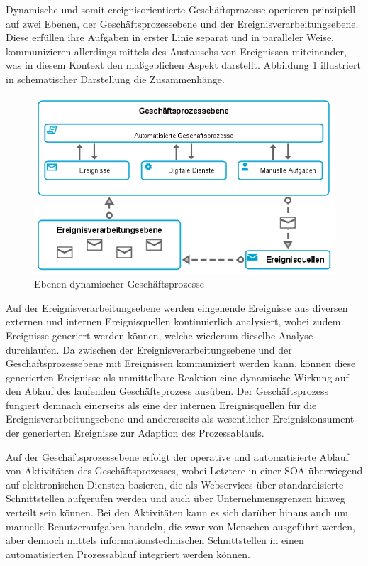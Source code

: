 Dynamische und somit ereignisorientierte Geschäftsprozesse operieren prinzipiell auf zwei Ebenen, der Geschäftsprozessebene und der Ereignisverarbeitungsebene. 
Diese erfüllen ihre Aufgaben in erster Linie separat und in paralleler Weise, kommunizieren allerdings mittels des Austauschs von Ereignissen miteinander, was in diesem Kontext den maßgeblichen Aspekt darstellt. 
Abbildung \ref{fig:Ebenen dynamischer Geschäftsprozesse} illustriert in schematischer Darstellung die Zusammenhänge.

\begin{figure}[H]
	\centering 
    \includegraphics[width=\textwidth]{img/dynamicbp.png}	
    \caption[Ebenen dynamischer Geschäftsprozesse]
    {Ebenen dynamischer Geschäftsprozesse \protect\footnotemark}
    \label{fig:Ebenen dynamischer Geschäftsprozesse}
\end{figure}


Auf der Ereignisverarbeitungsebene werden eingehende Ereignisse aus diversen externen und internen Ereignisquellen kontinuierlich analysiert, wobei zudem Ereignisse generiert werden können, welche wiederum dieselbe Analyse durchlaufen. 
Da zwischen der Ereignisverarbeitungsebene und der Geschäftsprozessebene mit Ereignissen kommuniziert werden kann, können diese generierten Ereignisse als unmittelbare Reaktion eine dynamische Wirkung auf den Ablauf des laufenden Geschäftsprozess ausüben.
Der Geschäftsprozess fungiert demnach einerseits als eine der internen Ereignisquellen für die Ereignisverarbeitungsebene und andererseits als wesentlicher Ereigniskonsument der generierten Ereignisse zur Adaption des Prozessablaufs.
\cite{Benker.2016}

Auf der Geschäftsprozessebene erfolgt der operative und automatisierte Ablauf von Aktivitäten des Geschäftsprozesses, wobei Letztere in einer \ac{SOA} überwiegend auf elektronischen Diensten basieren, die als Webservices über standardisierte Schnittstellen aufgerufen werden und auch über Unternehmensgrenzen hinweg verteilt sein können.
\cite{Finger.2009}
Bei den Aktivitäten kann es sich darüber hinaus auch um manuelle Benutzeraufgaben handeln, die zwar von Menschen ausgeführt werden, aber dennoch mittels informationstechnischen Schnittstellen in einen automatisierten Prozessablauf integriert werden können.
\cite{Bruns.2010}


